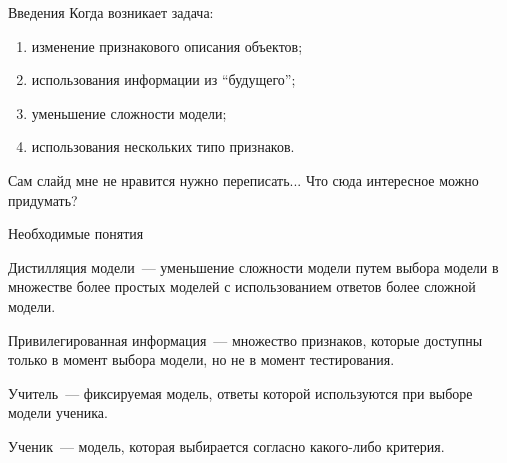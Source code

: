 \documentclass[9pt,pdf,hyperref={unicode}]{beamer}
\begin{document}
\begin{frame}{Введения}
\justifying
Когда возникает задача:
\begin{enumerate}
	\item изменение признакового описания объектов;
	\item использования информации из ``будущего'';
	\item уменьшение сложности модели;
	\item использования нескольких типо признаков.
\end{enumerate}

{\color{red} Сам слайд мне не нравится нужно переписать... Что сюда интересное можно придумать?}
\end{frame}
\begin{frame}{Необходимые понятия}
\justifying
\begin{definition}
\justifying
Дистилляция модели~--- уменьшение сложности модели путем выбора модели в множестве более простых моделей с использованием ответов более сложной модели.
\end{definition}

\begin{definition}
\justifying
Привилегированная информация~--- множество признаков, которые доступны только в момент выбора модели, но не в момент тестирования.
\end{definition}

\begin{definition}
\justifying
Учитель~--- фиксируемая модель, ответы которой используются при выборе модели ученика.
\end{definition}

\begin{definition}
\justifying
Ученик~--- модель, которая выбирается согласно какого-либо критерия.
\end{definition}

\end{frame}
\end{document}
